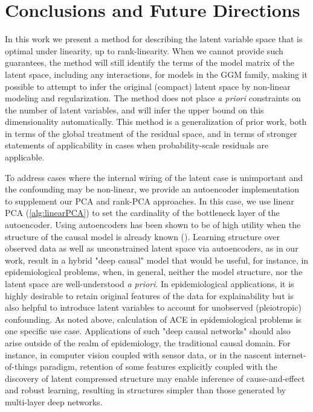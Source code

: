 \documentclass{article}
\begin{document}
\section{Conclusions and Future Directions}
In this work we present a method for describing the latent variable space that is optimal under linearity, up to rank-linearity.  When we cannot provide such guarantees, the method will still identify the terms of the model matrix of the latent space, including any interactions, for models in the GGM family, making it possible to attempt to infer the original (compact) latent space by non-linear modeling and regularization.  The method does not place \textit{a priori} constraints on the number of latent variables, and will infer the upper bound on this dimensionality automatically.  This method is a generalization of prior work, both in terms of the global treatment of the residual space, and in terms of stronger statements of applicability in cases when probability-scale residuals are applicable.  

To address cases where the internal wiring of the latent case is unimportant and the confounding may be non-linear, we provide an autoencoder implementation to supplement our PCA and rank-PCA approaches.  In this case, we use linear PCA (\ref{alg:linearPCA}) to set the cardinality of the bottleneck layer of the autoencoder.  Using autoencoders has been shown to be of high utility when the structure of the causal model is already known (\cite{louizos_causal_2017}).  Learning structure over observed data as well as unconstrained latent space via autoencoders, as in our work, result in a hybrid "deep causal" model that would be useful, for instance, in epidemiological problems, when, in general, neither the model structure, nor the latent space are well-understood \textit{a priori}.  In epidemiological applications, it is highly desirable to retain original features of the data for explainability but is also helpful to introduce latent variables to account for unobserved (pleiotropic) confounding.  As noted above, calculation of ACE in epidemiological problems is one specific use case.  Applications of such "deep causal networks" should also arise outside of the realm of epidemiology, the traditional causal domain.  For instance, in computer vision coupled with sensor data, or in the nascent internet-of-things paradigm, retention of some features explicitly coupled with the discovery of latent compressed structure may enable inference of cause-and-effect and robust learning, resulting in structures simpler than those generated by multi-layer deep networks.

\clearpage
 
\small


\end{document}
